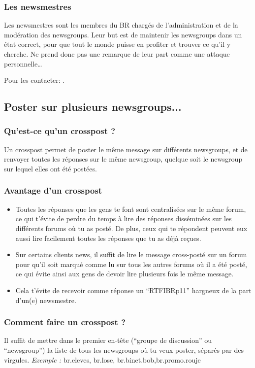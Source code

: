 \subsubsection{Les newsmestres}
Les newsmestres sont les membres du BR charg\'es de l'administration et de la mod\'eration des newsgroups.
Leur but est de maintenir les newsgroups dans un \'etat correct, pour que tout le monde puisse en profiter
et trouver ce qu'il y cherche.
Ne prend donc pas une remarque de leur part comme une attaque personnelle\ldots

Pour les contacter: .

\subsection{Poster sur plusieurs newsgroups...}
\subsubsection{Qu'est-ce qu'un crosspost ?}
Un crosspost permet de poster le m\^eme message sur diff\'erents newsgroups,
et de renvoyer toutes les r\'eponses sur le m\^eme newsgroup,
quelque soit le newsgroup sur lequel elles ont \'et\'e post\'ees.

\subsubsection{Avantage d'un crosspost}
\begin{itemize}
 \item Toutes les r\'eponses que les gens te font sont centralis\'ees sur le m\^eme forum,
       ce qui t'\'evite de perdre du temps \`a lire des r\'eponses diss\'emin\'ees
       sur les diff\'erents forums o\`u tu as post\'e.
       De plus, ceux qui te r\'epondent peuvent eux aussi lire facilement toutes les r\'eponses
       que tu as d\'ej\`a re\c{c}ues.
 \item Sur certains clients news, il suffit de lire le message cross-post\'e sur un forum
       pour qu'il soit marqu\'e comme lu sur tous les autres forums o\`u il a \'et\'e post\'e,
       ce qui \'evite ainsi aux gens de devoir lire plusieurs fois le m\^eme message.
 \item Cela t'\'evite de recevoir comme r\'eponse un ``RTFIBRp11'' hargneux de la part d'un(e) newsmestre.
\end{itemize}

\subsubsection{Comment faire un crosspost ?}
Il suffit de mettre dans le premier en-t\^ete (``groupe de discussion'' ou ``newsgroup'')
la liste de tous les newsgroups o\`u tu veux poster, s\'epar\'es par des virgules.
\emph{Exemple :} br.eleves, br.lose, br.binet.bob,br.promo.rouje

